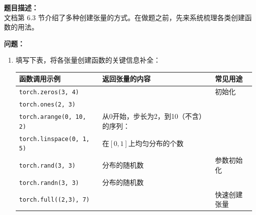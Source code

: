 \documentclass[a4paper,11pt]{ctexart}
\begin{document}
\begin{problembox}
    \textbf{题目描述：}\\
    文档第 6.3 节介绍了多种创建张量的方式。在做题之前，先来系统梳理各类创建函数的用法。

    \vspace{0.3cm}
    \textbf{问题：}
    \begin{enumerate}[(1)]
        \item 填写下表，将各张量创建函数的关键信息补全：

        \begin{center}
        \begin{tabular}{p{3.5cm} p{4.5cm} p{4.5cm}}
            \toprule
            函数调用示例 & 返回张量的内容 & 常见用途 \\
            \midrule
            \texttt{torch.zeros(3, 4)} & \underline{\hspace{3.5cm}} & 初始化\underline{\hspace{2.5cm}} \\[1.2em]
            \texttt{torch.ones(2, 3)} & \underline{\hspace{3.5cm}} & \underline{\hspace{3.5cm}} \\[1.2em]
            \texttt{torch.arange(0, 10, 2)} & 从0开始，步长为2，到10（不含）的序列：\underline{\hspace{1.5cm}} & \underline{\hspace{3.5cm}} \\[1.2em]
            \texttt{torch.linspace(0, 1, 5)} & 在$[0,1]$上均匀分布的\underline{\hspace{0.8cm}}个数 & \underline{\hspace{3.5cm}} \\[1.2em]
            \texttt{torch.rand(3, 3)} & \underline{\hspace{3.5cm}}分布的随机数 & 参数\underline{\hspace{2.0cm}}初始化 \\[1.2em]
            \texttt{torch.randn(3, 3)} & \underline{\hspace{3.5cm}}分布的随机数 & \underline{\hspace{3.5cm}} \\[1.2em]
            \texttt{torch.full((2,3), 7)} & \underline{\hspace{3.5cm}} & 快速创建\underline{\hspace{2.0cm}}张量 \\
            \bottomrule
        \end{tabular}
        \end{center}


\end{enumerate}
\end{problembox}
\end{document}
